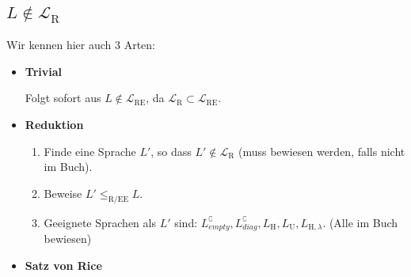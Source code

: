 \documentclass[a4paper, 11pt]{article}
\def\L{\mathcal{L}}
\def\Lr{\mathcal{L}_\text{R}}
\begin{document}
                    \subsection{$L \notin \Lr$}
                        Wir kennen hier auch 3 Arten:
                        \begin{itemize}[label=-]
                            \item \textbf{Trivial}
                            
                            Folgt sofort aus $L \notin \L_{\text{RE}}$, da $\L_{\text{R}} \subset \L_{\text{RE}}$.
                            \item \textbf{Reduktion}
                            \begin{enumerate}[label=(\alph*)]
                               \item Finde eine Sprache $L'$, so dass $L' \notin \L_{\text{R}}$ (muss bewiesen werden, falls nicht im Buch).
                               \item Beweise $L' \leq_{\text{R/EE}} L$.
                               \item Geeignete Sprachen als $L'$ sind: $L_{empty}^\complement, L_{diag}^\complement, L_\text{H}, L_\text{U}, L_{\text{H}, \lambda}$. (Alle im Buch bewiesen)
                            \end{enumerate}
                            \item \textbf{Satz von Rice} 
                        \end{itemize}
                
                
\end{document}
